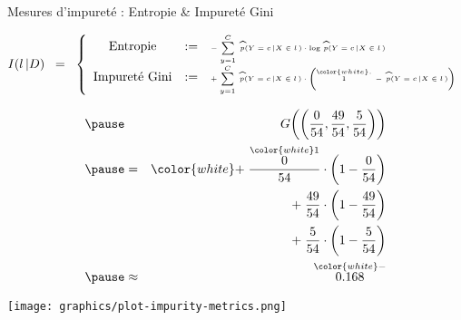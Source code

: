 
\begin{frame}{\vskip -0.2cm \Large Mesures d'impuret\'e : Entropie \& Impuret\'e Gini}

\vskip -0.2cm
\tiny
\begin{equation*}
I(l\,\vert D)
\;\; = \;\;
\left\{\begin{array}{ccl}
\textnormal{Entropie}
& := &
	\textnormal{\tiny$-\;\overset{C}{\underset{y=1}{\sum}}\;\,
	\widehat{p}(Y=c\,\vert X\in l\,) \cdot \log\,\widehat{p}(Y=c\,\vert X\in l\,)$}
\\
\textnormal{Impuret\'e Gini}
& := &
	\textnormal{\tiny$+\;\overset{C}{\underset{y=1}{\sum}}\;\,
	\widehat{p}(Y=c\,\vert X\in l\,) \cdot
	\left(\overset{{\color{white}.}}{1}\,-\,\widehat{p}(Y=c\,\vert X\in l\,)\right)$}
\end{array}\right.
\end{equation*}

\begin{multicols}{2}

	\begin{minipage}{4.5cm}
	\begin{flushleft}
	\vskip 0.25cm
	{\scriptsize
	\begin{eqnarray*}
	\pause
	&&
		\textnormal{\normalsize$G\!\left(\left(\frac{0}{54},\frac{49}{54},\frac{5}{54}\right)\right)$}
	\\
	\pause
	& = &
		{\color{white}+} \;\frac{\overset{{\color{white}1}}{0}}{54} \cdot \left( 1 - \frac{0}{54} \right)
	\\
	&&
		+ \;\frac{49}{54} \cdot \left( 1 - \frac{49}{54} \right)
	\\
	&&
		+ \;\frac{5}{54} \cdot \left( 1 - \frac{5}{54} \right)
	\\
	\pause
	& \approx &
		\overset{{\color{white}-}}{\textnormal{\normalsize$0.168$}}
	\end{eqnarray*}
	}
	\end{flushleft}
	\end{minipage}
	
\columnbreak

	\pause
	\begin{minipage}{4.5cm}
	\begin{flushright}
	\texttt{[image: graphics/plot-impurity-metrics.png]}
	\end{flushright}
	\end{minipage}
	
\end{multicols}

\end{frame}
\normalsize


